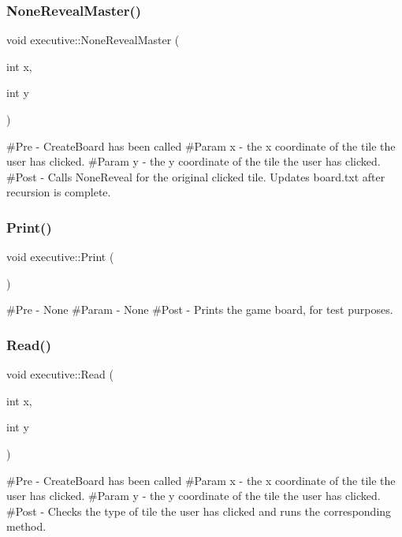 \subsubsection{\texorpdfstring{NoneRevealMaster()}{NoneRevealMaster()}}
{\footnotesize\ttfamily void executive\+::\+None\+Reveal\+Master (\begin{DoxyParamCaption}\item[{int}]{x,  }\item[{int}]{y }\end{DoxyParamCaption})}

\#\+Pre -\/ Create\+Board has been called \#\+Param x -\/ the x coordinate of the tile the user has clicked. \#\+Param y -\/ the y coordinate of the tile the user has clicked. \#\+Post -\/ Calls None\+Reveal for the original clicked tile. Updates board.\+txt after recursion is complete. \mbox{\label{classexecutive_ae5e04159c4d86678485e4d788f302732}} 
\subsubsection{\texorpdfstring{Print()}{Print()}}
{\footnotesize\ttfamily void executive\+::\+Print (\begin{DoxyParamCaption}{ }\end{DoxyParamCaption})}

\#\+Pre -\/ None \#\+Param -\/ None \#\+Post -\/ Prints the game board, for test purposes. \mbox{\label{classexecutive_ab92cac9cdd28c568d079653c516c6a35}} 
\subsubsection{\texorpdfstring{Read()}{Read()}}
{\footnotesize\ttfamily void executive\+::\+Read (\begin{DoxyParamCaption}\item[{int}]{x,  }\item[{int}]{y }\end{DoxyParamCaption})}

\#\+Pre -\/ Create\+Board has been called \#\+Param x -\/ the x coordinate of the tile the user has clicked. \#\+Param y -\/ the y coordinate of the tile the user has clicked. \#\+Post -\/ Checks the type of tile the user has clicked and runs the corresponding method. \mbox{\label{classexecutive_ad2c46b69f5f3592067d26e3dd7280616}} 
